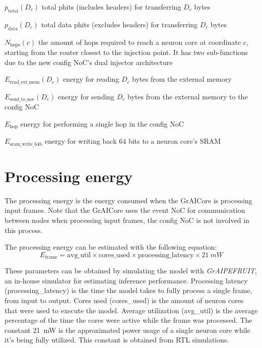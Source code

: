 \begin{eqexpl}[15mm]
    \item{$p_{\textrm{total}}(D_c)$} total phits (includes headers) for transferring $D_c$ bytes
    \item{$p_{\textrm{data}}(D_c)$} total data phits (excludes headers) for transferring $D_c$ bytes
    \item{$N_{\textrm{hops}}(c)$} the amount of hops required to reach a neuron core at coordinate $c$, starting from the router closest to the injection point. It has two sub-functions due to the new config NoC's dual injector architecture
    \item{$E_{\textrm{read\_ext\_mem}}(D_c)$} energy for reading $D_c$ bytes from the external memory
    \item{$E_{\textrm{send\_to\_noc}}(D_c)$} energy for sending $D_c$ bytes from the external memory to the config NoC
    \item{$E_{\textrm{hop}}$} energy for performing a single hop in the config NoC
    \item{$E_{\textrm{sram\_write\_64b}}$} energy for writing back 64 bits to a neuron core's SRAM
\end{eqexpl}

\section{Processing energy}
The processing energy is the energy consumed when the GrAICore is processing input frames.
Note that the GrAICore uses the event NoC for communication between nodes when processing input frames, the config NoC is not involved in this process.

The processing energy can be estimated with the following equation:
\begin{equation}
    E_{\textrm{frame}} = \textrm{avg\_util} \times \textrm{cores\_used} \times \textrm{processing\_latency} \times \SI{21}{mW}
\end{equation}

These parameters can be obtained by simulating the model with \textit{GrAIPEFRUIT}, an in-house simulator for estimating inference performance.
Processing latency (\textrm{processing\_latency}) is the time the model takes to fully process a single frame, from input to output.
Cores used (\textrm{cores\_used}) is the amount of neuron cores that were used to execute the model.
Average utilization (\textrm{avg\_util}) is the average percentage of the time the cores were active while the frame was processed. 
The constant \SI{21}{mW} is the approximated power usage of a single neuron core while it's being fully utilized.
This constant is obtained from RTL simulations.


